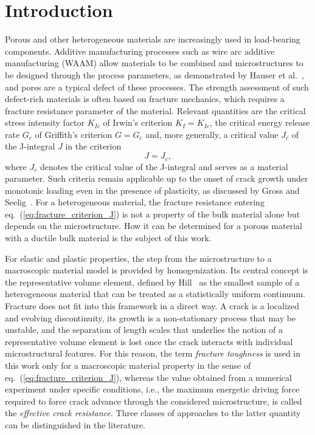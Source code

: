 \documentclass[pdflatex,sn-mathphys-num]{sn-jnl}%
\theoremstyle{thmstyleone}%
\theoremstyle{thmstyletwo}%
\theoremstyle{thmstylethree}%
\begin{document}
\section{Introduction}\label{sec:intro}

Porous and other heterogeneous materials are increasingly used in load-bearing components. Additive manufacturing processes such as wire arc additive manufacturing (WAAM) allow materials to be combined and microstructures to be designed through the process parameters, as demonstrated by Hauser et al.~\cite{hauser_porosity_2021}, and pores are a typical defect of these processes. The strength assessment of such defect-rich materials is often based on fracture mechanics, which requires a fracture resistance parameter of the material. Relevant quantities are the critical stress intensity factor $K_{Ic}$ of Irwin's criterion $K_I = K_{Ic}$, the critical energy release rate $G_c$ of Griffith's criterion $G = G_c$ and, more generally, a critical value $J_c$ of the J-integral $J$ in the criterion
\begin{equation}
    J = J_c,
    \label{eq:fracture_criterion_J}
\end{equation}
where \( J_c \) denotes the critical value of the J-integral and serves as a material parameter.
Such criteria
remain applicable up to the onset of crack growth under monotonic loading even
in the presence of plasticity, as discussed by Gross and Seelig~\cite{gross_fracture_2011}.
For a heterogeneous material, the fracture resistance entering eq.~(\ref{eq:fracture_criterion_J}) is not a property of the bulk material alone but depends on the microstructure. How it can be determined for a porous material with a ductile bulk material is the subject of this work.



For elastic and plastic properties, the step from the microstructure to a macroscopic material model is provided by homogenization. Its central concept is the representative volume element, defined by Hill~\cite{hill_elastic_1963} as the smallest sample of a heterogeneous material that can be treated as a statistically uniform continuum. Fracture does not fit into this framework in a direct way. A crack is a localized and evolving discontinuity, its growth is a non-stationary process that may be unstable, and the separation of length scales that underlies the notion of a representative volume element is lost once the crack interacts with individual microstructural features. For this reason, the term \textsl{fracture toughness} is used in this work only for a macroscopic material property in the sense of eq.~(\ref{eq:fracture_criterion_J}), whereas the value obtained from a numerical experiment under specific conditions, i.e., the maximum energetic driving force required to force crack advance through the considered microstructure, is called the \textsl{effective crack resistance}. Three classes of approaches to the latter quantity can be distinguished in the literature.
\end{document}

